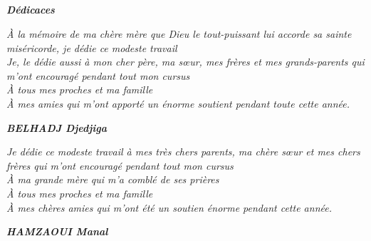 \begin{center}
	\chapter*{}
\end{center}%
\label{Chapter0} %

\vspace{50px}
\begin{center}
	\textbf{\textit{{\huge  Dédicaces}}}
\end{center}
\vspace{20px}
\begin{center}
\textit{À la mémoire de ma chère mère que Dieu le tout-puissant lui accorde sa sainte miséricorde, je dédie ce modeste travail\\
Je, le dédie aussi à mon cher père, ma sœur, mes frères et mes grands-parents qui m'ont encouragé pendant tout mon cursus\\
À tous mes proches et ma famille\\
À mes amies qui m'ont apporté un énorme soutient pendant toute cette année.\\}
\end{center}

\begin{flushright}
	\textit{\textbf{BELHADJ Djedjiga}}
\end{flushright}
\vspace{20px}
\begin{center}
\textit{Je dédie ce modeste travail à mes très chers parents, ma chère sœur et mes chers frères qui m'ont encouragé pendant tout mon cursus\\
À ma grande mère qui m'a comblé de ses prières \\
À tous mes proches et ma famille\\
À mes chères amies qui m'ont été un soutien énorme pendant cette année.\\}
\end{center}
\begin{flushright}
	\textit{\textbf{HAMZAOUI Manal}}
\end{flushright}

\clearpage